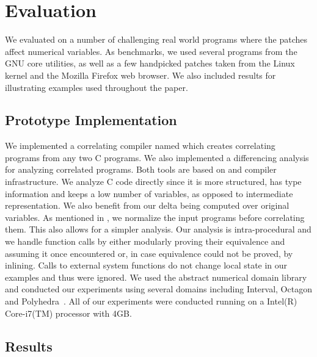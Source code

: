 \section{Evaluation}
We evaluated {\tool} on a number of challenging real world programs where the patches affect numerical variables. As benchmarks, we used several programs from the GNU core utilities, as well as a few handpicked patches taken from the Linux kernel and the Mozilla Firefox web browser. We also included results for illustrating examples used throughout the paper.

\subsection{Prototype Implementation}
We implemented a correlating compiler named  which creates correlating programs from any two C programs. We also implemented a differencing analysis for analyzing correlated programs. Both tools are based on  and  compiler infrastructure. We analyze C code directly since it is more structured, has type information and keeps a low number of variables, as opposed to intermediate representation. We also benefit from our delta being computed over original variables. As mentioned in , we normalize the input programs before correlating them. This also allows for a simpler analysis. Our analysis is intra-procedural and we handle function calls by either modularly proving their equivalence and assuming it once encountered or, in case equivalence could not be proved, by inlining. Calls to external system functions do not change local state in our examples and thus were ignored. We used the  abstract numerical domain library and conducted our experiments using several domains including Interval, Octagon \cite{Mine2006} and Polyhedra~\cite{CousotHalbwachs78}. All of our experiments were conducted running on a Intel(R) Core-i7(TM) processor with 4GB.

\subsection{Results}



